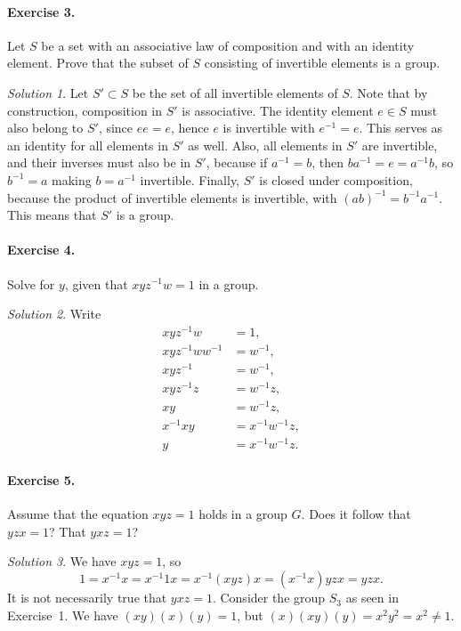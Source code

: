 \documentclass[11pt]{report}
\theoremstyle{remark}
\newtheorem*{solution}{Solution}
\begin{document}
    \paragraph{Exercise 3.} Let $S$ be a set with an associative law of composition
    and with an identity element. Prove that the subset of $S$ consisting of
    invertible elements is a group.
    \begin{solution}
        Let $S' \subset S$ be the set of all invertible elements of $S$. Note that
        by construction, composition in $S'$ is associative. The identity element
        $e \in S$ must also belong to $S'$, since $ee = e$, hence $e$ is invertible
        with $e^{-1} = e$. This serves as an identity for all elements in $S'$ as
        well. Also, all elements in $S'$ are invertible, and their inverses must
        also be in $S'$, because if $a^{-1} = b$, then $ba^{-1} = e = a^{-1}b$, so
        $b^{-1} = a$ making $b = a^{-1}$ invertible. Finally, $S'$ is closed under
        composition, because the product of invertible elements is invertible, with
        $(ab)^{-1} = b^{-1}a^{-1}$. This means that $S'$ is a group.
    \end{solution}
    
    \paragraph{Exercise 4.} Solve for $y$, given that $xyz^{-1}w = 1$ in a group.
    \begin{solution}
        Write \begin{align*}
            xyz^{-1}w &= 1, \\
            xyz^{-1}ww^{-1}& = w^{-1}, \\
            xyz^{-1} &= w^{-1}, \\
            xyz^{-1}z &= w^{-1}z, \\
            xy &= w^{-1}z, \\
            x^{-1}xy &= x^{-1}w^{-1}z, \\
            y &= x^{-1}w^{-1}z.
        \end{align*}
    \end{solution}
    
    \paragraph{Exercise 5.} Assume that the equation $xyz = 1$ holds in a group $G$.
    Does it follow that $yzx = 1$? That $yxz = 1$?
    \begin{solution}
        We have $xyz = 1$, so \[
            1 = x^{-1}x = x^{-1}1x = x^{-1}(xyz)x = (x^{-1}x)yzx = yzx.
        \] It is not necessarily true that $yxz = 1$. Consider the group $S_3$ as
        seen in Exercise~1. We have $(xy)(x)(y) = 1$, but $(x)(xy)(y) = x^2y^2 = x^2
        \neq 1$.
    \end{solution}
\end{document}
